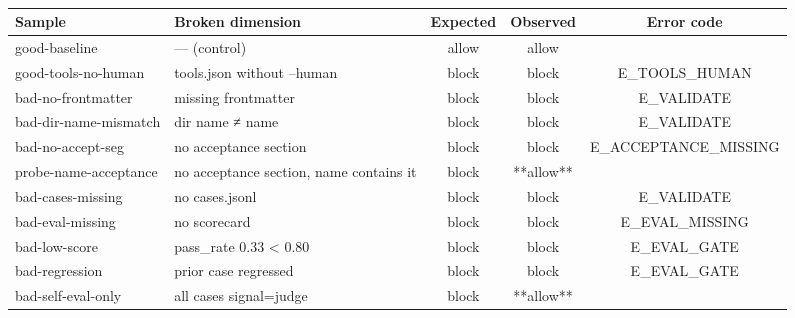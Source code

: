 \begin{table}[t]
\centering
\caption{}
\label{tab:main}
\begin{tabular}{llccc}
\toprule
\textbf{Sample} & \textbf{Broken dimension} & \textbf{Expected} & \textbf{Observed} & \textbf{Error code} \\
\midrule
good-baseline & — (control) & allow & allow &  \\
good-tools-no-human & tools.json without --human & block & block & E_TOOLS_HUMAN \\
bad-no-frontmatter & missing frontmatter & block & block & E_VALIDATE \\
bad-dir-name-mismatch & dir name ≠ name & block & block & E_VALIDATE \\
bad-no-accept-seg & no acceptance section & block & block & E_ACCEPTANCE_MISSING \\
probe-name-acceptance & no acceptance section, name contains it & block & **allow** &  \\
bad-cases-missing & no cases.jsonl & block & block & E_VALIDATE \\
bad-eval-missing & no scorecard & block & block & E_EVAL_MISSING \\
bad-low-score & pass_rate 0.33 < 0.80 & block & block & E_EVAL_GATE \\
bad-regression & prior case regressed & block & block & E_EVAL_GATE \\
bad-self-eval-only & all cases signal=judge & block & **allow** &  \\
\bottomrule
\end{tabular}
\end{table}
